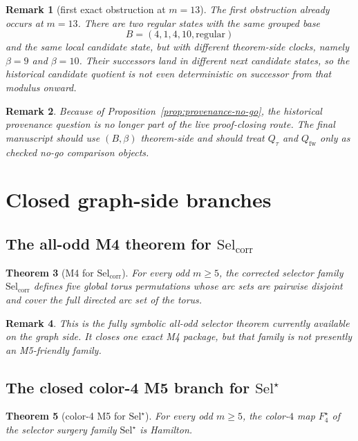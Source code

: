 \documentclass[11pt]{article}
\newtheorem{theorem}{Theorem}[section]
\newtheorem{remark}[theorem]{Remark}
\newcommand{\SelCorr}{\mathrm{Sel}_{\mathrm{corr}}}
\newcommand{\SelStar}{\mathrm{Sel}^{\star}}
\begin{document}
\begin{remark}[first exact obstruction at $m=13$]
The first obstruction already occurs at $m=13$.
There are two regular states with the same grouped base
\[
B=(4,1,4,10,\mathrm{regular})
\]
and the same local candidate state, but with different theorem-side clocks,
namely $\beta=9$ and $\beta=10$.
Their successors land in different next candidate states, so the historical
candidate quotient is not even deterministic on successor from that modulus
onward.
\end{remark}

\begin{remark}
Because of Proposition~\ref{prop:provenance-no-go}, the historical provenance
question is no longer part of the live proof-closing route. The final manuscript
should use $(B,\beta)$ theorem-side and should treat $Q_{\tau}$ and
$Q_{\mathrm{fw}}$ only as checked no-go comparison objects.
\end{remark}

\section{Closed graph-side branches}

\subsection{The all-odd M4 theorem for $\SelCorr$}

\begin{theorem}[M4 for $\SelCorr$]
\label{thm:M4-SelCorr}
For every odd $m\ge 5$, the corrected selector family $\SelCorr$ defines five
global torus permutations whose arc sets are pairwise disjoint and cover the
full directed arc set of the torus.
\end{theorem}

\begin{remark}
This is the fully symbolic all-odd selector theorem currently available on the
graph side. It closes one exact M4 package, but that family is not presently
an M5-friendly family.
\end{remark}

\subsection{The closed color-4 M5 branch for $\SelStar$}

\begin{theorem}[color-4 M5 for $\SelStar$]
\label{thm:M5-color4-SelStar}
For every odd $m\ge 5$, the color-$4$ map $F_4^{\star}$ of the selector surgery
family $\SelStar$ is Hamilton.
\end{theorem}
\end{document}

